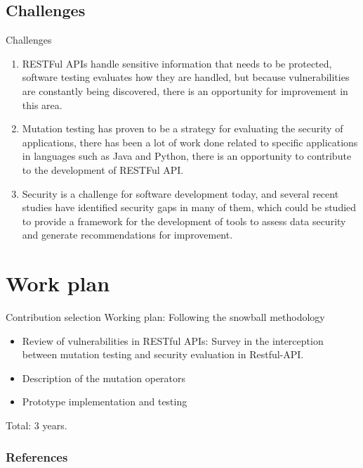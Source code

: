 \documentclass[10pt]{beamer}
\theoremstyle{remark}
\theoremstyle{definition}
\begin{document}
\subsection{Challenges}

\begin{frame}{Challenges}
\begin{enumerate}
    \item RESTFul APIs handle sensitive information that needs to be protected, software testing evaluates how they are handled, but because vulnerabilities are constantly being discovered, there is an opportunity for improvement in this area.
    \item Mutation testing has proven to be a strategy for evaluating the security of applications, there has been a lot of work done related to specific applications in languages such as Java and Python, there is an opportunity to contribute to the development of RESTFul API.
    \item Security is a challenge for software development today, and several recent studies have identified security gaps in many of them, which could be studied to provide a framework for the development of tools to assess data security and generate recommendations for improvement.
\end{enumerate}
\end{frame}


\section{Work plan}

\begin{frame}{Contribution selection}
Working plan: Following the snowball methodology
\begin{itemize}
    \item Review of vulnerabilities in RESTful APIs: Survey in the interception between mutation testing and security evaluation in Restful-API.
    \item Description of the mutation operators
    \item Prototype implementation and testing
\end{itemize}
Total: 3 years.
\end{frame}


\nocite{*}
\begin{frame}[allowframebreaks]
\frametitle{References}
\printbibliography
\end{frame}
\end{document}
